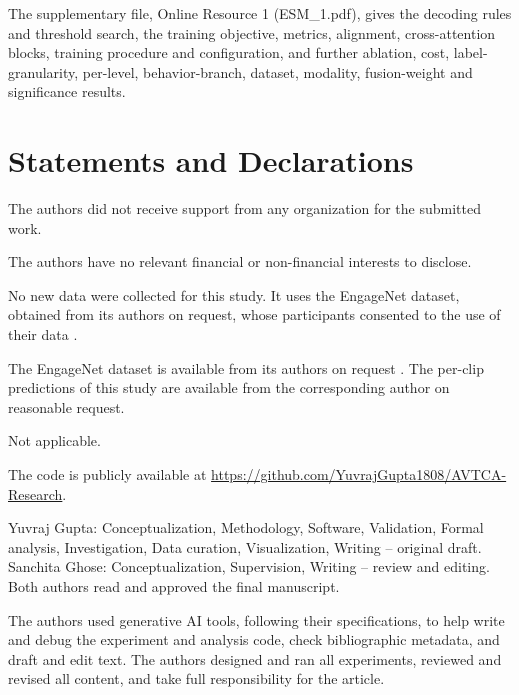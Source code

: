 \documentclass[pdflatex,iicol,sn-basic]{sn-jnl}
\begin{document}
\backmatter

The supplementary file, Online Resource 1 (ESM\_1.pdf), gives the decoding rules and threshold search, the training objective, metrics, alignment, cross-attention blocks, training procedure and configuration, and further ablation, cost, label-granularity, per-level, behavior-branch, dataset, modality, fusion-weight and significance results.


\section*{Statements and Declarations}

The authors did not receive support from any organization for the submitted work.

The authors have no relevant financial or non-financial interests to disclose.

No new data were collected for this study. It uses the EngageNet dataset, obtained from its authors on request, whose participants consented to the use of their data \citep{singh2023engagenet}.

The EngageNet dataset is available from its authors on request \citep{singh2023engagenet}. The per-clip predictions of this study are available from the corresponding author on reasonable request.

Not applicable.

The code is publicly available at \url{https://github.com/YuvrajGupta1808/AVTCA-Research}.

Yuvraj Gupta: Conceptualization, Methodology, Software, Validation, Formal analysis, Investigation, Data curation, Visualization, Writing -- original draft. Sanchita Ghose: Conceptualization, Supervision, Writing -- review and editing. Both authors read and approved the final manuscript.

The authors used generative AI tools, following their specifications, to help write and debug the experiment and analysis code, check bibliographic metadata, and draft and edit text. The authors designed and ran all experiments, reviewed and revised all content, and take full responsibility for the article.

\end{document}
